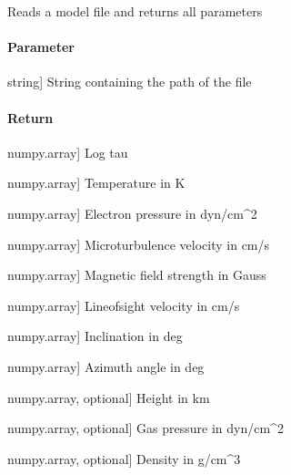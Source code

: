 \documentclass[letterpaper,10pt,english]{sphinxmanual}
\begin{document}
\begin{fulllineitems}
\label{\detokenize{functions:sir.read_model}}
\pysigstartsignatures
{}
\pysigstopsignatures
\sphinxAtStartPar
Reads a model file and returns all parameters


\paragraph{Parameter}
\label{\detokenize{functions:id13}}\begin{description}
\sphinxlineitem{filename}{[}string{]}
\sphinxAtStartPar
String containing the path of the file

\end{description}


\paragraph{Return}
\label{\detokenize{functions:id14}}\begin{description}
\sphinxlineitem{log\_tau}{[}numpy.array{]}
\sphinxAtStartPar
Log tau

\sphinxlineitem{T}{[}numpy.array{]}
\sphinxAtStartPar
Temperature in K

\sphinxlineitem{Pe}{[}numpy.array{]}
\sphinxAtStartPar
Electron pressure in dyn/cm\textasciicircum{}2

\sphinxlineitem{v\_micro}{[}numpy.array{]}
\sphinxAtStartPar
Microturbulence velocity in cm/s

\sphinxlineitem{B}{[}numpy.array{]}
\sphinxAtStartPar
Magnetic field strength in Gauss

\sphinxlineitem{vlos}{[}numpy.array{]}
\sphinxAtStartPar
Line\sphinxhyphen{}of\sphinxhyphen{}sight velocity in cm/s

\sphinxlineitem{inc}{[}numpy.array{]}
\sphinxAtStartPar
Inclination in deg

\sphinxlineitem{azimuth}{[}numpy.array{]}
\sphinxAtStartPar
Azimuth angle in deg

\sphinxlineitem{z}{[}numpy.array, optional{]}
\sphinxAtStartPar
Height in km

\sphinxlineitem{Pg}{[}numpy.array, optional{]}
\sphinxAtStartPar
Gas pressure in dyn/cm\textasciicircum{}2

\sphinxlineitem{rho}{[}numpy.array, optional{]}
\sphinxAtStartPar
Density in g/cm\textasciicircum{}3

\end{description}

\end{fulllineitems}
\end{document}
